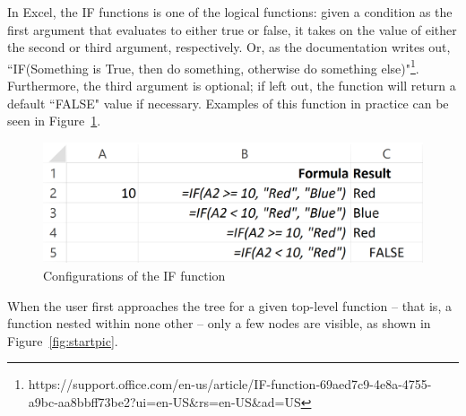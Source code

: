 \documentclass[conference]{IEEEtran}
\begin{document}
	In Excel, the IF functions is one of the logical
	functions: given a condition as the first argument that evaluates to either
	true or false, it takes on the value of either the second or third argument,
	respectively. Or, as the documentation writes out, ``IF(Something is True, then
	do something, otherwise do something
	else)"\footnote{https://support.office.com/en-us/article/IF-function-69aed7c9-4e8a-4755-a9bc-aa8bbff73be2?ui=en-US\&rs=en-US\&ad=US}. Furthermore, the third argument is optional; if left out, the function will return a default ``FALSE" value if necessary. Examples of this function in practice can be seen in Figure~\ref{fig:ifexample}.
	
	\begin{figure}[h] \centering \includegraphics[scale=.9]{ifExample}
		\caption{Configurations of the IF function} \label{fig:ifexample} \end{figure}
	
	When the user first approaches the tree for a given top-level function -- that
	is, a function nested within none other -- only a few nodes are visible, as
	shown in Figure~\ref{fig:startpic}. \par
	
\end{document}
